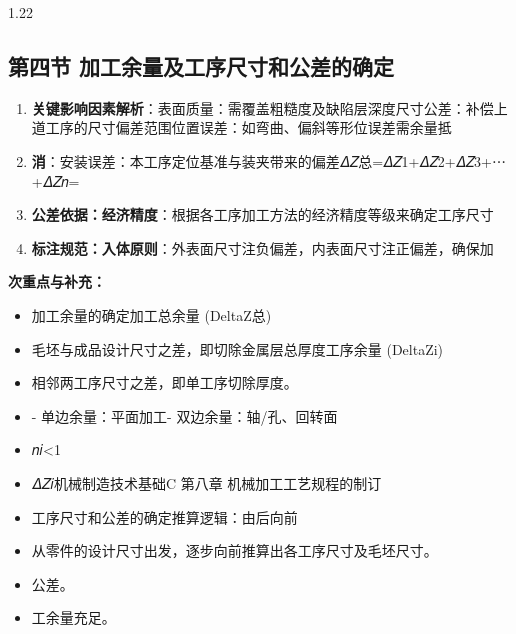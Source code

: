 \documentclass[12pt,a4paper]{article}
\begin{document}
\begin{spacing}{1.22}
\subsection{第四节 加工余量及工序尺寸和公差的确定}
\begin{tcolorbox}[colback=yellow!6,colframe=red!55!black,title=重点,left=1mm,right=1mm]
\begin{enumerate}[leftmargin=2.2em,label=\arabic*.]
  \item \textbf{关键影响因素解析}：表面质量：需覆盖粗糙度及缺陷层深度尺寸公差：补偿上道工序的尺寸偏差范围位置误差：如弯曲、偏斜等形位误差需余量抵
  \item \textbf{消}：安装误差：本工序定位基准与装夹带来的偏差𝛥𝑍总=𝛥𝑍1+𝛥𝑍2+𝛥𝑍3+⋯+𝛥𝑍𝑛=
  \item \textbf{公差依据：经济精度}：根据各工序加工方法的经济精度等级来确定工序尺寸
  \item \textbf{标注规范：入体原则}：外表面尺寸注负偏差，内表面尺寸注正偏差，确保加
\end{enumerate}
\end{tcolorbox}
\noindent\textbf{次重点与补充：}
\begin{itemize}[leftmargin=2.2em,label=--]
  \item 加工余量的确定加工总余量 (DeltaZ总)
  \item 毛坯与成品设计尺寸之差，即切除金属层总厚度工序余量 (DeltaZi)
  \item 相邻两工序尺寸之差，即单工序切除厚度。
  \item - 单边余量：平面加工- 双边余量：轴/孔、回转面
  \item 𝑛𝑖<1
  \item 𝛥𝑍𝑖机械制造技术基础C 第八章 机械加工工艺规程的制订
  \item 工序尺寸和公差的确定推算逻辑：由后向前
  \item 从零件的设计尺寸出发，逐步向前推算出各工序尺寸及毛坯尺寸。
  \item 公差。
  \item 工余量充足。
\end{itemize}


\end{spacing}
\end{document}
